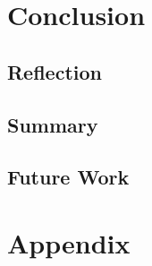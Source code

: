 \part{Conclusion}

\chapter{Reflection}


\chapter{Summary}


\chapter{Future Work}


\printbibliography

\part{Appendix}
\appendix

 
